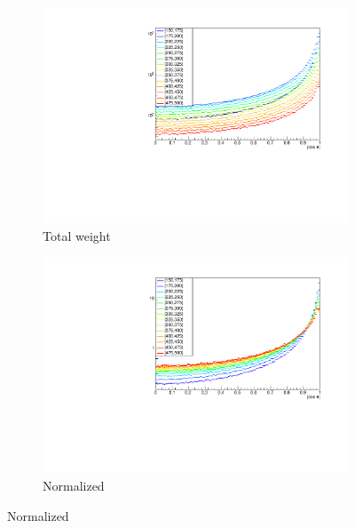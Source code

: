 \documentclass[12pt]{article}
\begin{document}
\begin{figure}[H]
  \centering
  \begin{subfigure}[b]{0.8\textwidth}
    \centering
    \caption{Total weight}
    \includegraphics[width=\textwidth,trim={10mm 0 10mm 13mm},clip]{plots/gosam.pdf}
  \end{subfigure}
  \begin{subfigure}[b]{0.8\textwidth}
    \centering
    \caption{Normalized}
    \includegraphics[width=\textwidth,trim={10mm 0 10mm 13mm},clip]{plots/gosam_norm.pdf}
  \end{subfigure}
\end{figure}
\end{document}
